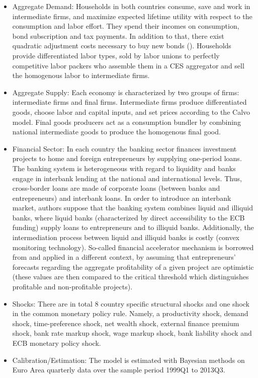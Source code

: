 \documentclass[11pt,a4paper]{article}
\begin{document}
	\begin{itemize}
		\item Aggregate  Demand:  Households  in  both countries consume, save and work in intermediate firms, and  maximize  expected  lifetime  utility  with respect to the consumption and labor effort.  They spend their incomes on consumption, bond subscription and tax payments. In addition to that, there exist quadratic adjustment costs necessary to buy new bonds (\cite{schmitt2003closing}). Households provide differentiated labor types, sold by labor unions to perfectly competitive labor packers who assemble them in a CES aggregator and sell the homogenous labor to intermediate firms.
		\item Aggregate  Supply:  Each  economy  is  characterized  by  two groups of firms: intermediate firms and final firms. Intermediate firms produce differentiated goods, choose labor and capital inputs, and set prices according to the Calvo model. Final goods producers act as a consumption bundler by combining national intermediate goods to produce the homogenous final good.
		\item Financial Sector:  In each country the banking sector finances investment projects to home and foreign entrepreneurs by supplying one-period loans. The banking system is heterogeneous with regard to liquidity and banks engage in interbank lending at the national and international levels. Thus, cross-border loans are made of corporate loans (between banks and entrepreneurs) and interbank loans. In order to introduce an interbank market, authors suppose that the banking system combines liquid and illiquid banks, where liquid banks (characterized by direct accessibility to the ECB funding) supply loans to entrepreneurs and to illiquid banks. Additionally, the intermediation process between liquid and illiquid banks is costly (convex monitoring technology). So-called financial accelerator mechanism is borrowed from \cite{de2010scientific} and applied in a different context, by assuming that entrepreneurs' forecasts regarding the aggregate profitability of a given project are optimistic (these values are then compared to the critical threshold which distinguishes profitable and non-profitable projects).
		\item Shocks:  There are in total 8 country specific structural shocks and one shock in the common monetary policy rule. Namely, a productivity shock, demand shock, time-preference shock, net wealth shock, external finance premium shock, bank rate markup shock, wage markup shock, bank liability shock and ECB monetary policy shock.
		\item Calibration/Estimation: The model is estimated with Bayesian methods on Euro Area quarterly data over the sample period 1999Q1 to 2013Q3.
	\end{itemize}
	
\end{document}
